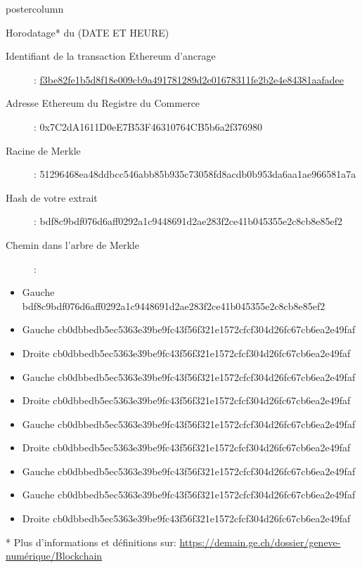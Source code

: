 \documentclass[roundedcorners=true, titleposition=center]{beamerthemeruhuisstijlposter}
\begin{document}
\begin{frame}
\begin{columns}
\begin{column}{0.95\textwidth}
\begin{beamercolorbox}[center, wd=\textwidth]{postercolumn}
\begin{minipage}[T]{0.95\textwidth}
{\begin{block}{Horodatage* du (DATE ET HEURE)}
\begin{description}
\item [Identifiant de la transaction Ethereum d’ancrage] :\linebreak
\href{https://etherscan.io/tx/f3be82fe1b5d8f18e009cb9a491781289d2e01678311fe2b2e4e84381aafadee}{f3be82fe1b5d8f18e009cb9a491781289d2e01678311fe2b2e4e84381aafadee}
\item[Adresse Ethereum du Registre du Commerce] :\linebreak
0x7C2dA1611D0eE7B53F46310764CB5b6a2f376980
\item[Racine de Merkle] :\linebreak
51296468ea48ddbcc546abb85b935c73058fd8acdb0b953da6aa1ae966581a7a
\item[Hash de votre extrait] :\linebreak
bdf8c9bdf076d6aff0292a1c9448691d2ae283f2ce41b045355e2c8cb8e85ef2
\item[Chemin dans l’arbre de Merkle] :
\end{description}
\begin{itemize}
\item Gauche bdf8c9bdf076d6aff0292a1c9448691d2ae283f2ce41b045355e2c8cb8e85ef2
\item Gauche cb0dbbedb5ec5363e39be9fc43f56f321e1572cfcf304d26fc67cb6ea2e49faf
\item Droite cb0dbbedb5ec5363e39be9fc43f56f321e1572cfcf304d26fc67cb6ea2e49faf
\item Gauche cb0dbbedb5ec5363e39be9fc43f56f321e1572cfcf304d26fc67cb6ea2e49faf
\item Droite cb0dbbedb5ec5363e39be9fc43f56f321e1572cfcf304d26fc67cb6ea2e49faf
\item Gauche cb0dbbedb5ec5363e39be9fc43f56f321e1572cfcf304d26fc67cb6ea2e49faf
\item Droite cb0dbbedb5ec5363e39be9fc43f56f321e1572cfcf304d26fc67cb6ea2e49faf
\item Gauche cb0dbbedb5ec5363e39be9fc43f56f321e1572cfcf304d26fc67cb6ea2e49faf
\item Gauche cb0dbbedb5ec5363e39be9fc43f56f321e1572cfcf304d26fc67cb6ea2e49faf
\item Droite cb0dbbedb5ec5363e39be9fc43f56f321e1572cfcf304d26fc67cb6ea2e49faf
\end{itemize}
\end{block}
* Plus d'informations et définitions sur: \url{https://demain.ge.ch/dossier/geneve-numérique/Blockchain}
}
\end{minipage}
\end{beamercolorbox}
\end{column}
\end{columns}
\end{frame}
\end{document}
